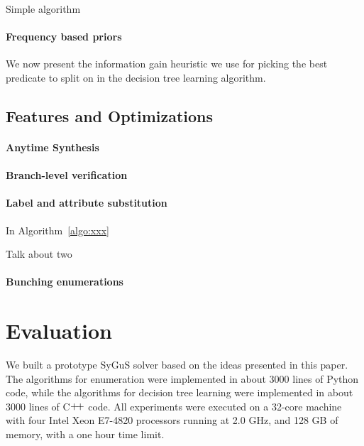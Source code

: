 \documentclass{llncs}
\newcommand{\sygus}{{\sffamily\fontsize{8.5}{10}\selectfont SyGuS}\xspace}
\begin{document}
\begin{example}
  Simple algorithm
\end{example}

\paragraph{Frequency based priors}
We now present the information gain heuristic we use for picking the
best predicate to split on in the decision tree learning algorithm.

\subsection{Features and Optimizations}
\label{sec:optimizations}

\paragraph{Anytime Synthesis}

\paragraph{Branch-level verification}

\paragraph{Label and attribute substitution}
In Algorithm~\ref{algo:xxx}

\begin{example}
  Talk about two 
\end{example}

\paragraph{Bunching enumerations}

\section{Evaluation}
\label{sec:evaluation}
% 


We built a prototype \sygus solver based on the ideas presented in
this paper. The algorithms for enumeration were implemented in
about 3000 lines of Python code, while the algorithms for decision
tree learning were implemented in about 3000 lines of
C$\raisebox{1pt}{+\!+}$ code. All experiments were executed on a
32-core machine with four Intel Xeon E7-4820 processors running at 2.0
GHz, and 128 GB of memory, with a one hour time limit.
\end{document}
